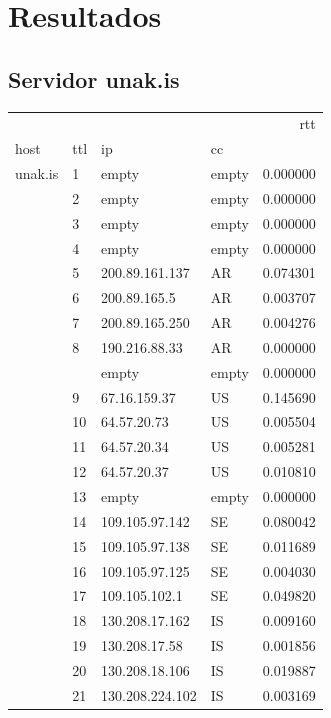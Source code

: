 \section{Resultados}
\subsection{Servidor unak.is}

\begin{center}
\begin{tabular}{llllr}
\toprule
        &    &               &    &       rtt \\
host & ttl & ip & cc &           \\
\midrule
unak.is & 1  & empty & empty &  0.000000 \\
        & 2  & empty & empty &  0.000000 \\
        & 3  & empty & empty &  0.000000 \\
        & 4  & empty & empty &  0.000000 \\
        & 5  & 200.89.161.137 & AR &  0.074301 \\
        & 6  & 200.89.165.5 &  AR &  0.003707 \\
        & 7  & 200.89.165.250 & AR &  0.004276 \\
        & 8  & 190.216.88.33 & AR &  0.000000 \\
        &    & empty & empty &  0.000000 \\
        & 9  & 67.16.159.37 & US &  0.145690 \\
        & 10 & 64.57.20.73 & US &  0.005504 \\
        & 11 & 64.57.20.34 & US &  0.005281 \\
        & 12 & 64.57.20.37 & US &  0.010810 \\
        & 13 & empty & empty &  0.000000 \\
        & 14 & 109.105.97.142 & SE &  0.080042 \\
        & 15 & 109.105.97.138 & SE &  0.011689 \\
        & 16 & 109.105.97.125 & SE &  0.004030 \\
        & 17 & 109.105.102.1 & SE &  0.049820 \\
        & 18 & 130.208.17.162 & IS &  0.009160 \\
        & 19 & 130.208.17.58 & IS &  0.001856 \\
        & 20 & 130.208.18.106 & IS &  0.019887 \\
        & 21 & 130.208.224.102 & IS &  0.003169 \\
\bottomrule
\end{tabular}
\end{center}


